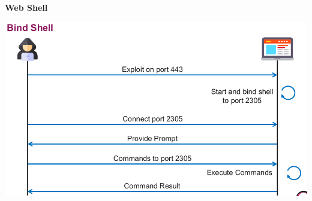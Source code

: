 \textbf{Web Shell}
\begin{center}
    \includegraphics[scale=0.5]{resources/02-bind-shell.png}
\end{center}
